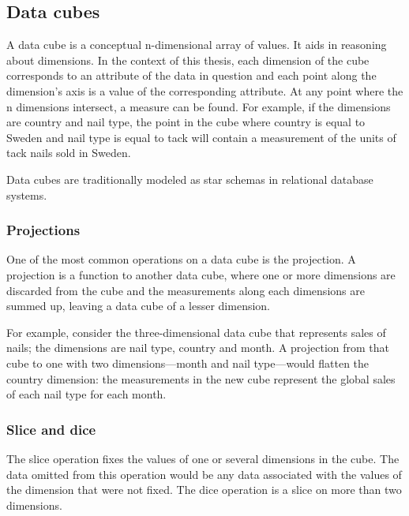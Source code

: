 \subsection*{Data cubes}

A data cube is a conceptual n-dimensional array of values. It aids in
reasoning about dimensions. In the context of this thesis, each dimension of
the cube corresponds to an attribute of the data in question and each point
along the dimension's axis is a value of the corresponding attribute. At any
point where the n dimensions intersect, a measure can be found. For example,
if the dimensions are country and nail type, the point in the cube where
country is equal to Sweden and nail type is equal to tack will contain a
measurement of the units of tack nails sold in Sweden.

Data cubes are traditionally modeled as star schemas in relational database
systems. \cite{olap_solutions}


\subsubsection*{Projections}

One of the most common operations on a data cube is the projection. A
projection is a function to another data cube, where one or more dimensions
are discarded from the cube and the measurements along each dimensions are
summed up, leaving a data cube of a lesser dimension.

For example, consider the three-dimensional data cube that represents sales of
nails; the dimensions are nail type, country and month. A projection from that
cube to one with two dimensions---month and nail type---would flatten the
country dimension: the measurements in the new cube represent the global sales
of each nail type for each month.


\subsubsection*{Slice and dice}


The slice operation fixes the values of one or several dimensions in the cube.
The data omitted from this operation would be any data associated with the
values of the dimension that were not fixed. The dice operation is a slice on
more than two dimensions.

